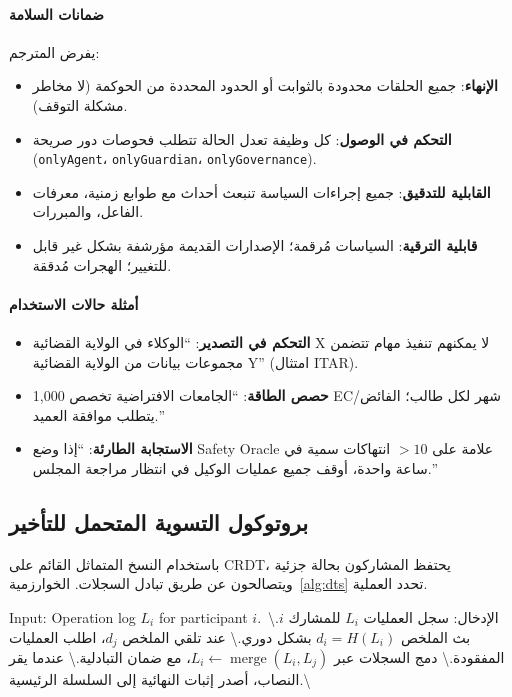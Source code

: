 \documentclass[11pt]{article}
\begin{document}
\paragraph{ضمانات السلامة} يفرض المترجم:
\begin{itemize}[noitemsep]
  \item \textbf{الإنهاء}: جميع الحلقات محدودة بالثوابت أو الحدود المحددة من الحوكمة (لا مخاطر مشكلة التوقف).
  \item \textbf{التحكم في الوصول}: كل وظيفة تعدل الحالة تتطلب فحوصات دور صريحة (\texttt{onlyAgent}، \texttt{onlyGuardian}، \texttt{onlyGovernance}).
  \item \textbf{القابلية للتدقيق}: جميع إجراءات السياسة تنبعث أحداث مع طوابع زمنية، معرفات الفاعل، والمبررات.
  \item \textbf{قابلية الترقية}: السياسات مُرقمة؛ الإصدارات القديمة مؤرشفة بشكل غير قابل للتغيير؛ الهجرات مُدققة.
\end{itemize}

\paragraph{أمثلة حالات الاستخدام}
\begin{itemize}[noitemsep]
  \item \textbf{التحكم في التصدير}: ``الوكلاء في الولاية القضائية X لا يمكنهم تنفيذ مهام تتضمن مجموعات بيانات من الولاية القضائية Y'' (امتثال ITAR).
  \item \textbf{حصص الطاقة}: ``الجامعات الافتراضية تخصص 1,000 EC/شهر لكل طالب؛ الفائض يتطلب موافقة العميد.''
  \item \textbf{الاستجابة الطارئة}: ``إذا وضع Safety Oracle علامة على $>10$ انتهاكات سمية في ساعة واحدة، أوقف جميع عمليات الوكيل في انتظار مراجعة المجلس.''
\end{itemize}

\subsection{بروتوكول التسوية المتحمل للتأخير}
باستخدام النسخ المتماثل القائم على CRDT، يحتفظ المشاركون بحالة جزئية ويتصالحون عن طريق تبادل السجلات. الخوارزمية~\ref{alg:dts} تحدد العملية.

\begin{algorithm}[H]
  \caption{التسوية المتحملة للتأخير (DTS)}
  \label{alg:dts}
  \begin{algorithmic}[1]
    \STATE Input: Operation log $L_i$ for participant $i$.\
    \STATE الإدخال: سجل العمليات $L_i$ للمشارك $i$.\textbackslash
    \STATE بث الملخص $d_i = H(L_i)$ بشكل دوري.\textbackslash
    \STATE عند تلقي الملخص $d_j$، اطلب العمليات المفقودة.\textbackslash
    \STATE دمج السجلات عبر $L_i \leftarrow \operatorname{merge}(L_i, L_j)$، مع ضمان التبادلية.\textbackslash
    \STATE عندما يقر النصاب، أصدر إثبات النهائية إلى السلسلة الرئيسية.\textbackslash
  \end{algorithmic}
\end{algorithm}
\end{document}
